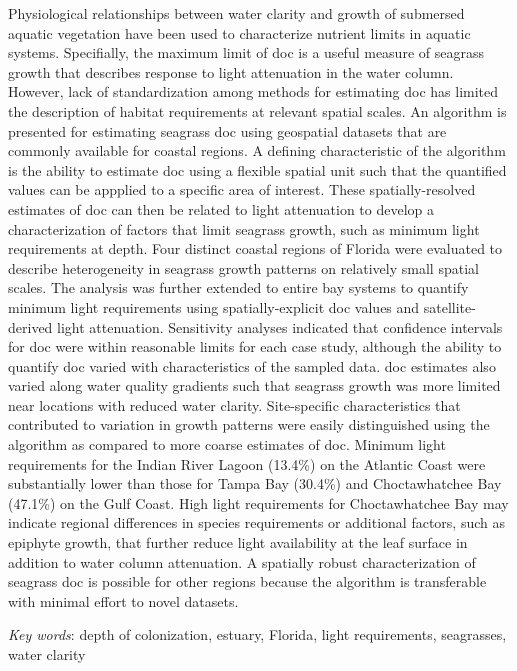 \documentclass[letterpaper,12pt,oneside]{article}\usepackage[]{graphicx}\usepackage[]{color}
\begin{document}
Physiological relationships between water clarity and growth of submersed aquatic vegetation have been used to  characterize nutrient limits in aquatic systems.  Specifially, the maximum limit of \ac{doc} is a useful measure of seagrass growth that describes response to light attenuation in the water column.  However, lack of standardization among methods for estimating \ac{doc} has limited the description of habitat requirements at relevant spatial scales.  An algorithm is presented for estimating seagrass \ac{doc} using geospatial datasets that are commonly available for coastal regions.  A defining characteristic of the algorithm is the ability to estimate \ac{doc} using a flexible spatial unit such that the quantified values can be appplied to a specific area of interest.  These spatially-resolved estimates of \ac{doc} can then be related to light attenuation to develop a characterization of factors that limit seagrass growth, such as minimum light requirements at depth.  Four distinct coastal regions of Florida were evaluated to describe heterogeneity in seagrass growth patterns on relatively small spatial scales.  The analysis was further extended to entire bay systems to quantify minimum light requirements using spatially-explicit \ac{doc} values and satellite-derived light attenuation.  Sensitivity analyses indicated that confidence intervals for \ac{doc} were within reasonable limits for each case study, although the ability to quantify \ac{doc} varied with characteristics of the sampled data.  \ac{doc} estimates also varied along water quality gradients such that seagrass growth was more limited near locations with reduced water clarity. Site-specific characteristics that contributed to variation in growth patterns were easily distinguished using the algorithm as compared to more coarse estimates of \ac{doc}.  Minimum light requirements for the Indian River Lagoon (13.4\%) on the Atlantic Coast were substantially lower than those for Tampa Bay (30.4\%) and Choctawhatchee Bay (47.1\%) on the Gulf Coast.  High light requirements for Choctawhatchee Bay may indicate regional differences in species requirements or additional factors, such as epiphyte growth, that further reduce light availability at the leaf surface in addition to water column attenuation.  A spatially robust characterization of seagrass \ac{doc} is possible for other regions because the algorithm is transferable with minimal effort to novel datasets.

\noindent \textit{Key words}: depth of colonization, estuary, Florida, light requirements, seagrasses, water clarity
\end{document}
